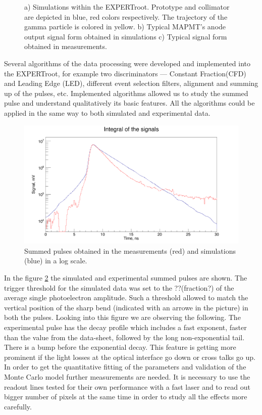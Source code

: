 \documentclass{webofc}
\newcommand{\er}{\textmd{EXPERTroot}}
\begin{document}
\begin{figure}[h]
\begin{minipage}[h]{0.35\linewidth}
	\end{minipage}
	\caption{a) Simulations within the \er. Prototype and collimator are depicted in blue, red colors respectively. The trajectory of the gamma particle is colored in yellow. b) Typical MAPMT's anode output signal form obtained in simulations c) Typical signal form obtained in measurements.}
	\label{ris:sim}
\end{figure}

Several algorithms of the data processing were developed and implemented into the \er, for example two discriminators --- Constant Fraction(CFD) and Leading Edge (LED), different event selection filters, alignment and summing up of the pulses, etc. Implemented algorithms allowed us to study the summed pulse and understand qualitatively its basic features. All the algorithms could be applied in the same way to both simulated and experimental data.

\begin{figure}
	\includegraphics[width=\linewidth]{sum.png}
	\caption{Summed pulses obtained in the measurements (red) and simulations (blue) in a log scale.}\label{ris:sum}
\end{figure}



In the figure \ref{ris:sum} the simulated and experimental summed pulses are shown. The trigger threshold for the simulated data was set to the ??(fraction?) of the average single photoelectron amplitude. Such a threshold allowed to match the vertical position of the sharp bend (indicated with an arrowe in the picture) in both the pulses. Looking into this figure we are observing the following. The experimental pulse has  the decay profile which includes a fast exponent, faster than the value from the data-sheet, followed by the long non-exponential tail. There is a bump before the exponential decay. This feature is getting more prominent if the light losses at the optical interface go down or cross talks go up.  In order to get the quantitative fitting of the parameters and validation of the Monte Carlo model further measurements are needed. It is necessary to use the readout lines tested for their own performance with a fast laser and to read out bigger number of pixels at the same time in order to study all the effects more carefully.
\end{document}

